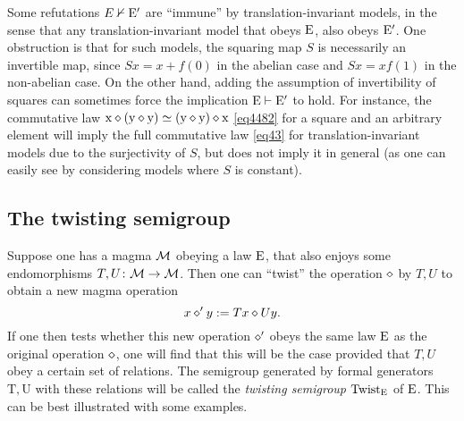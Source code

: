   Some refutations $E \nvdash {\mathrm{E}'}$ are ``immune'' by translation-invariant models, in the sense that any translation-invariant model that obeys $\mathrm{E}$, also obeys ${\mathrm{E}'}$.  One obstruction is that for such models, the squaring map $S$ is necessarily an invertible map, since $Sx = x + f(0)$ in the abelian case and $Sx = xf(1)$ in the non-abelian case. On the other hand, adding the assumption of invertibility of squares can sometimes force the implication $\mathrm{E} \vdash {\mathrm{E}'}$ to hold.  For instance, the commutative law $\mathrm{x} \diamond (\mathrm{y} \diamond \mathrm{y}) \simeq (\mathrm{y} \diamond \mathrm{y}) \diamond \mathrm{x}$ \eqref{eq4482} for a square and an arbitrary element will imply the full commutative law \eqref{eq43} for translation-invariant models due to the surjectivity of $S$, but does not imply it in general (as one can easily see by considering models where $S$ is constant).

\subsection{The twisting semigroup}\label{twisting-sec}

Suppose one has a magma ${\mathcal{M}}$ obeying a law $\mathrm{E}$, that also enjoys some endomorphisms $T, U \colon {\mathcal{M}} \to {\mathcal{M}}$.  Then one can ``twist'' the operation $\diamond$ by $T,U$ to obtain a new magma operation
\begin{equation}\label{twist} x \diamond' y := Tx \diamond Uy.
\end{equation}
If one then tests whether this new operation $\diamond'$ obeys the same law $\mathrm{E}$ as the original operation $\diamond$, one will find that this will be the case provided that $T,U$ obey a certain set of relations.  The semigroup generated by formal generators $\mathrm{T}, \mathrm{U}$ with these relations will be called the \emph{twisting semigroup} $\operatorname{Twist}_{\mathrm{E}}$ of $\mathrm{E}$.  This can be best illustrated with some examples.

